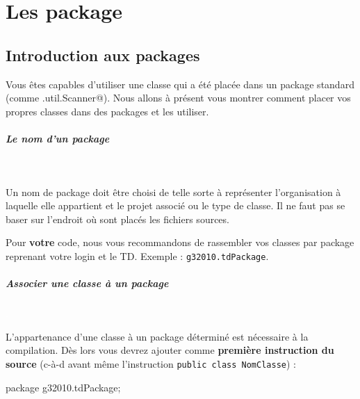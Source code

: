 \documentclass[11pt,a4paper]{article}
\begin{document}
            \section{Les package}\subsection{Introduction aux packages}
				Vous \^etes capables d'utiliser une classe
				qui a \'et\'e plac\'ee dans un package standard 
				(comme \verb@java.util.Scanner@).
				Nous allons \`a pr\'esent vous montrer
				comment placer vos propres classes dans des packages
				et les utiliser.
			
            \par
        
			
		\subparagraph{Le nom d'un package} 
		
					\textcolor{white}{.} \par
				
            \par
        
				Un nom de package doit \^etre choisi de telle sorte
				\`a repr\'esenter l'organisation \`a laquelle elle
				appartient et le projet associ\'e ou
				le type de classe.
				Il ne faut pas se baser sur l'endroit o\`u sont plac\'es 
				les fichiers sources.
			
            \par
        
				Pour \textbf{votre} code, 
				nous vous recommandons de rassembler vos classes
				par package reprenant votre login et le TD.
				Exemple : \verb|g32010.tdPackage|. 
			
            \par
        
			
		\subparagraph{Associer une classe \`a un package} 
		
					\textcolor{white}{.} \par
				
            \par
        
				L'appartenance d'une classe \`a un package d\'etermin\'e est n\'ecessaire \`a la compilation. 
				D\`es lors vous devrez ajouter comme \textbf{premi\`ere instruction du source} 
				(c-\`a-d avant m\^eme l'instruction \verb|public class NomClasse|) :
			
            \par
        \begin{Java}
	package g32010.tdPackage;
			\end{Java}
			
\end{document}
